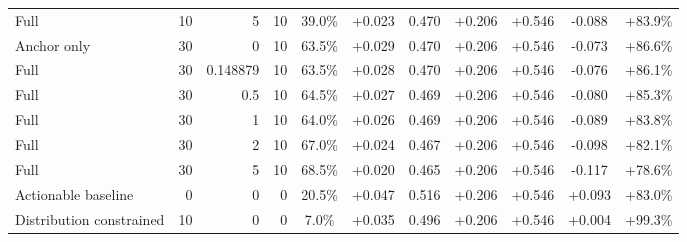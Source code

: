 \begin{table}[htbp]
\begin{tabular}{lrrrccccccc}
Full & 10 & 5 & 10 & 39.0\% & +0.023 & 0.470 & +0.206 & +0.546 & -0.088 & +83.9\% \\
Anchor only & 30 & 0 & 10 & 63.5\% & +0.029 & 0.470 & +0.206 & +0.546 & -0.073 & +86.6\% \\
Full & 30 & 0.148879 & 10 & 63.5\% & +0.028 & 0.470 & +0.206 & +0.546 & -0.076 & +86.1\% \\
Full & 30 & 0.5 & 10 & 64.5\% & +0.027 & 0.469 & +0.206 & +0.546 & -0.080 & +85.3\% \\
Full & 30 & 1 & 10 & 64.0\% & +0.026 & 0.469 & +0.206 & +0.546 & -0.089 & +83.8\% \\
Full & 30 & 2 & 10 & 67.0\% & +0.024 & 0.467 & +0.206 & +0.546 & -0.098 & +82.1\% \\
Full & 30 & 5 & 10 & 68.5\% & +0.020 & 0.465 & +0.206 & +0.546 & -0.117 & +78.6\% \\
Actionable baseline & 0 & 0 & 0 & 20.5\% & +0.047 & 0.516 & +0.206 & +0.546 & +0.093 & +83.0\% \\
Distribution constrained & 10 & 0 & 0 & 7.0\% & +0.035 & 0.496 & +0.206 & +0.546 & +0.004 & +99.3\% \\
\bottomrule
\end{tabular}
\end{table}